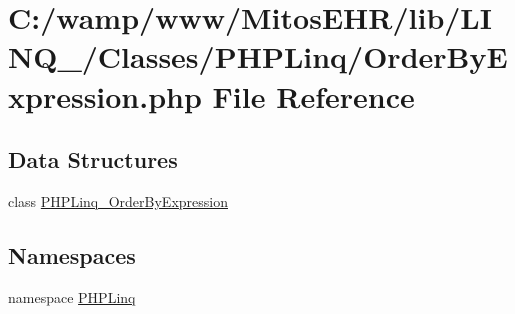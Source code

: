 \hypertarget{_order_by_expression_8php}{\section{\-C\-:/wamp/www/\-Mitos\-E\-H\-R/lib/\-L\-I\-N\-Q\-\_/\-Classes/\-P\-H\-P\-Linq/\-Order\-By\-Expression.php \-File \-Reference}
\label{_order_by_expression_8php}
}
\subsection*{\-Data \-Structures}
\begin{DoxyCompactItemize}
\item 
class \hyperlink{class_p_h_p_linq___order_by_expression}{\-P\-H\-P\-Linq\-\_\-\-Order\-By\-Expression}
\end{DoxyCompactItemize}
\subsection*{\-Namespaces}
\begin{DoxyCompactItemize}
\item 
namespace \hyperlink{namespace_p_h_p_linq}{\-P\-H\-P\-Linq}
\end{DoxyCompactItemize}
